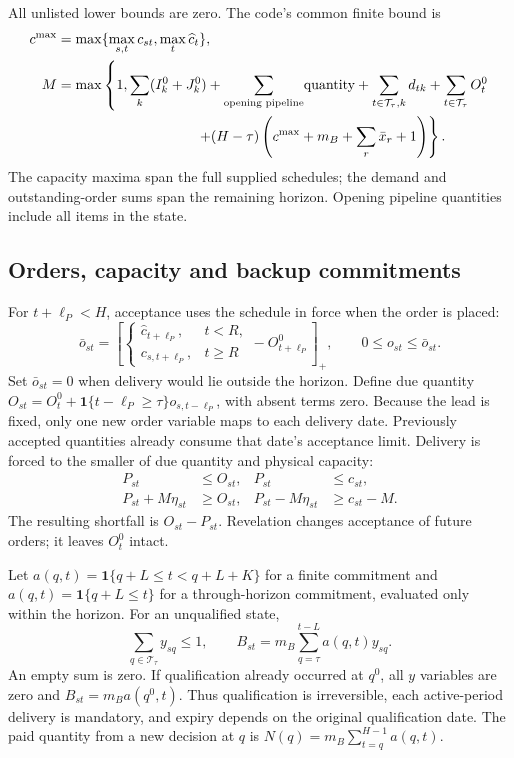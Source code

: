 \documentclass[preprint,11pt,authoryear]{elsarticle}
\begin{document}
All unlisted lower bounds are zero. The code's common finite bound is
\begin{align}
 c^{\max}&=\max\{\max_{s,t}c_{st},\max_t\widehat c_t\},\nonumber\\
 M&=\max\left\{1,\sum_k(I^0_k+J^0_k)+\sum_{\text{opening pipeline}}\!\text{quantity}
 +\sum_{t\in\mathcal T_\tau,k}d_{tk}+\sum_{t\in\mathcal T_\tau}O^0_t\right.\nonumber\\
 &\hspace{35mm}\left. +(H-\tau)\left(c^{\max}+m_B+\sum_r\bar x_r+1\right)\right\}.\label{eq:net_M}
\end{align}
The capacity maxima span the full supplied schedules; the demand and outstanding-order sums span the remaining horizon. Opening pipeline quantities include all items in the state.

\subsection{Orders, capacity and backup commitments}
For $t+\ell_P<H$, acceptance uses the schedule in force when the order is placed:
\begin{equation}
 \bar o_{st}=\left[\begin{cases}\widehat c_{t+\ell_P},&t<R,\\c_{s,t+\ell_P},&t\ge R\end{cases}-O^0_{t+\ell_P}\right]_+,
 \qquad 0\le o_{st}\le\bar o_{st}.\label{eq:net_accept}
\end{equation}
Set $\bar o_{st}=0$ when delivery would lie outside the horizon. Define due quantity
$O_{st}=O^0_t+\mathbf1\{t-\ell_P\ge\tau\}o_{s,t-\ell_P}$, with absent terms zero. Because the lead is fixed, only one new order variable maps to each delivery date. Previously accepted quantities already consume that date's acceptance limit. Delivery is forced to the smaller of due quantity and physical capacity:
\begin{align}
 P_{st}&\le O_{st},& P_{st}&\le c_{st},\nonumber\\
 P_{st}+M\eta_{st}&\ge O_{st},&P_{st}-M\eta_{st}&\ge c_{st}-M.\label{eq:net_delivery}
\end{align}
The resulting shortfall is $O_{st}-P_{st}$. Revelation changes acceptance of future orders; it leaves $O^0_t$ intact.

Let $a(q,t)=\mathbf1\{q+L\le t<q+L+K\}$ for a finite commitment and $a(q,t)=\mathbf1\{q+L\le t\}$ for a through-horizon commitment, evaluated only within the horizon. For an unqualified state,
\begin{equation}
 \sum_{q\in\mathcal T_\tau}y_{sq}\le1,\qquad
 B_{st}=m_B\sum_{q=\tau}^{t-L}a(q,t)y_{sq}.\label{eq:net_backup}
\end{equation}
An empty sum is zero. If qualification already occurred at $q^0$, all $y$ variables are zero and $B_{st}=m_Ba(q^0,t)$. Thus qualification is irreversible, each active-period delivery is mandatory, and expiry depends on the original qualification date. The paid quantity from a new decision at $q$ is $N(q)=m_B\sum_{t=q}^{H-1}a(q,t)$.
\end{document}
